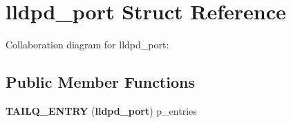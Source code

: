 \section{lldpd\-\_\-port \-Struct \-Reference}
\label{structlldpd__port}


\-Collaboration diagram for lldpd\-\_\-port\-:
\subsection*{\-Public \-Member \-Functions}
\begin{DoxyCompactItemize}
\item 
{\bfseries \-T\-A\-I\-L\-Q\-\_\-\-E\-N\-T\-R\-Y} ({\bf lldpd\-\_\-port}) p\-\_\-entries\label{structlldpd__port_abdbcb55b29eb915afa997f509eba896d}

\end{DoxyCompactItemize}
